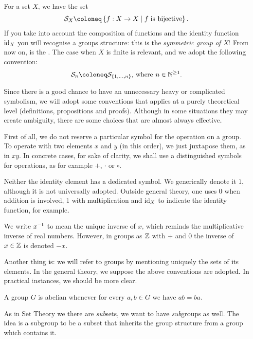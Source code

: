\begin{example}
For a set \(X\), we have the set
\[\cals_X \coloneq \set{f : X \to X \mid f \text{ is bijective}} .\]
If you take into account the composition of functions and the identity function \(\text{id}_X\) you will recognise a groups structure: this is the {\em symmetric group of \(X\)}! From now on,  is the . The case when \(X\) is finite is relevant, and we adopt the following convention:
\[\cals_n \coloneq \cals_{\set{1, \dots{}, n}} \text{, where } n \in \nn^{\ge 1} .\]
\end{example}

Since there is a good chance to have an unnecessary heavy or complicated symbolism, we will adopt some conventions that applies at a purely theoretical level (definitions, propositions and proofs). Although in some situations they may create ambiguity, there are some choices that are almost always effective.

First of all, we do not reserve a particular symbol for the operation on a group. To operate with two elements \(x\) and \(y\) (in this order), we just juxtapose them, as in \(xy\). In concrete cases, for sake of clarity, we shall use a distinguished symbols for operations, as for example \(+\), \(\cdot\) or \(\circ\).

Neither the identity element has a dedicated symbol. We generically denote it \(1\), although it is not universally adopted. Outside general theory, one uses \(0\) when addition is involved, \(1\) with multiplication and \(\text{id}_X\) to indicate the identity function, for example.

We write \(x^{-1}\) to mean the unique inverse of \(x\), which reminds the multiplicative inverse of real numbers. However, in groups as \(\mathbb Z\) with \(+\) and \(0\) the inverse of \(x \in \mathbb Z\) is denoted \(-x\).

Another thing is: we will refer to groups by mentioning uniquely the sets of its elements. In the general theory, we suppose the above conventions are adopted. In practical instances, we should be more clear.

\begin{definition}
A group \(G\) is abelian whenever for every \(a, b \in G\) we have \(ab= ba\).
\end{definition}

As in Set Theory we there are {\em sub}sets, we want to have {\em sub}groups as well. The idea is a subgroup to be a subset that inherits the group structure from a group which contains it.

